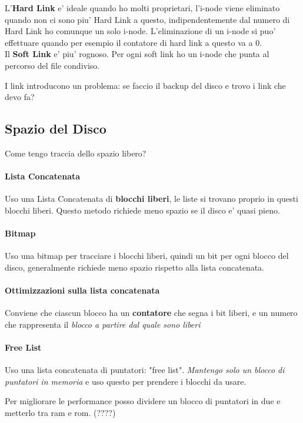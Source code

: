 L'\textbf{Hard Link} e' ideale quando ho molti proprietari, l'i-node viene eliminato quando non ci sono piu'
Hard Link a questo, indipendentemente dal numero di Hard Link ho comunque un solo i-node.
L'eliminazione di un i-node si puo' effettuare quando per esempio il contatore di hard link a questo va a 0. \\

Il \textbf{Soft Link} e' piu' rognoso. Per ogni soft link ho un i-node che punta al percorso del file condiviso.

I link introducono un problema: se faccio il backup del disco e trovo i link che devo fa?

\subsection{Spazio del Disco}
Come tengo traccia dello spazio libero?
\paragraph{Lista Concatenata}
Uso una Lista Concatenata di \textbf{blocchi liberi}, le liste si trovano proprio in questi blocchi liberi.
Questo metodo richiede meno spazio se il disco e' quasi pieno.

\paragraph{Bitmap}
Uso una bitmap per tracciare i blocchi liberi, quindi un bit per ogni blocco del disco, generalmente
richiede meno spazio rispetto alla lista concatenata.

\paragraph{Ottimizzazioni sulla lista concatenata}
Conviene che ciascun blocco ha un \textbf{contatore} che segna i bit liberi, e un numero che rappresenta
il \textit{blocco a partire dal quale sono liberi}

\paragraph{Free List}
Uso una lista concatenata di puntatori: "free list". \textit{Mantengo solo un blocco di puntatori in memoria} e uso questo per
prendere i blocchi da usare.

Per migliorare le performance posso dividere un blocco di puntatori in due e metterlo tra ram e rom. (????)

